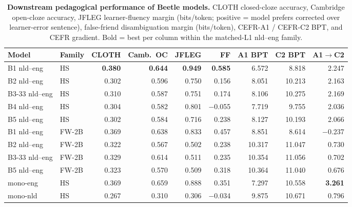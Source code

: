 \documentclass[11pt]{article}
\newcommand{\beetle}{Beetle} %
\begin{document}
 
\begin{table}[!ht]
  \centering \scriptsize
  \setlength{\tabcolsep}{4pt}
  \caption{\textbf{Downstream pedagogical performance of \beetle{} models.} CLOTH closed-cloze accuracy, Cambridge open-cloze accuracy, JFLEG learner-fluency margin (bits/token; positive = model prefers corrected over learner-error sentence), false-friend disambiguation margin (bits/token), CEFR-A1 / CEFR-C2 BPT, and CEFR gradient. Bold = best per column within the matched-L1 nld--eng family.}
  \label{tab:headline_pedagogical}
  \begin{tabular}{llrrrrrrr}
    \toprule
    Model & Family & CLOTH & Camb.~OC & JFLEG & FF & A1 BPT & C2 BPT & A1$\to$C2 \\
    \midrule
    B1 nld--eng     & HS & \textbf{0.380} & \textbf{0.644} & \textbf{0.949} & \textbf{0.585} & 6.572 & 8.818 & 2.247 \\
    B2 nld--eng     & HS & 0.302 & 0.596 & 0.750 & 0.156 & 8.051 & 10.213 & 2.163 \\
    B3-33 nld--eng  & HS & 0.310 & 0.587 & 0.751 & 0.174 & 8.106 & 10.275 & 2.169 \\
    B4 nld--eng     & HS & 0.304 & 0.582 & 0.801 & $-$0.055 & 7.719 & 9.755 & 2.036 \\
    B5 nld--eng     & HS & 0.302 & 0.584 & 0.716 & 0.238 & 8.127 & 10.193 & 2.066 \\
    \midrule
    B1 nld--eng     & FW-2B & 0.369 & 0.638 & 0.833 & 0.457 & 8.851 & 8.614 & $-$0.237 \\
    B2 nld--eng     & FW-2B & 0.322 & 0.567 & 0.502 & 0.238 & 10.317 & 11.047 & 0.730 \\
    B3-33 nld--eng  & FW-2B & 0.329 & 0.614 & 0.511 & 0.235 & 10.354 & 11.056 & 0.702 \\
    B5 nld--eng     & FW-2B & 0.323 & 0.570 & 0.509 & 0.318 & 10.364 & 11.040 & 0.676 \\
    \midrule
    mono-eng        & HS & 0.369 & 0.659 & 0.888 & 0.351 & 7.297 & 10.558 & \textbf{3.261} \\
    mono-nld        & HS & 0.267 & 0.310 & 0.306 & $-$0.034 & 9.875 & 10.671 & 0.796 \\
    \bottomrule
  \end{tabular}
\end{table}
 
\clearpage


\end{document}
